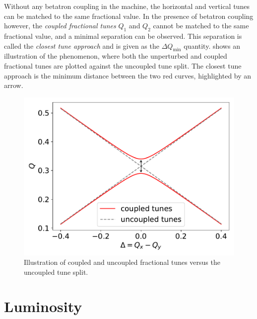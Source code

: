 Without any betatron coupling in the machine, the horizontal and vertical tunes can be matched to the same fractional value.
In the presence of betatron coupling however, the \emph{coupled fractional tunes} \(Q_1\) and \(Q_2\) cannot be matched to the same fractional value, and a minimal separation can be observed.
This separation is called the \emph{closest tune approach} and is given as the \(\Delta Q_{\mathrm{min}}\) quantity.
 shows an illustration of the phenomenon, where both the unperturbed and coupled fractional tunes are plotted against the uncoupled tune split.
The closest tune approach is the minimum distance between the two red curves, highlighted by an arrow.

\begin{figure}[!htb]
    \begin{center}
    \includegraphics[width = 0.9\linewidth]{Figures/Chapter2/tune_perturbation.pdf}
    \caption{Illustration of coupled and uncoupled fractional tunes versus the uncoupled tune split.}
    \label{figure:closest_tune_approach}
    \end{center}
\end{figure}


\section{Luminosity}

